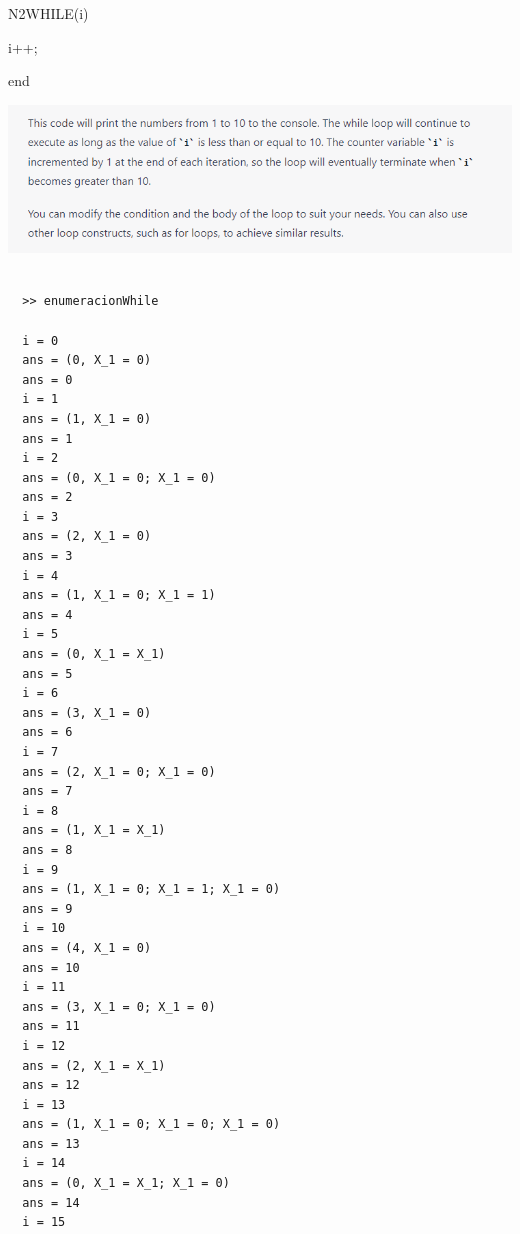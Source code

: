 \documentclass{article}
\begin{document}
  N2WHILE(i)
  
  
  i++;

end

\vspace{5mm}

\includegraphics[scale=0.75]{4.3.png}

\newpage

\begin{verbatim}

  >> enumeracionWhile

  i = 0
  ans = (0, X_1 = 0)
  ans = 0
  i = 1
  ans = (1, X_1 = 0)
  ans = 1
  i = 2
  ans = (0, X_1 = 0; X_1 = 0)
  ans = 2
  i = 3
  ans = (2, X_1 = 0)
  ans = 3
  i = 4
  ans = (1, X_1 = 0; X_1 = 1)
  ans = 4
  i = 5
  ans = (0, X_1 = X_1)
  ans = 5
  i = 6
  ans = (3, X_1 = 0)
  ans = 6
  i = 7
  ans = (2, X_1 = 0; X_1 = 0)
  ans = 7
  i = 8
  ans = (1, X_1 = X_1)
  ans = 8
  i = 9
  ans = (1, X_1 = 0; X_1 = 1; X_1 = 0)
  ans = 9
  i = 10
  ans = (4, X_1 = 0)
  ans = 10
  i = 11
  ans = (3, X_1 = 0; X_1 = 0)
  ans = 11
  i = 12
  ans = (2, X_1 = X_1)
  ans = 12
  i = 13
  ans = (1, X_1 = 0; X_1 = 0; X_1 = 0)
  ans = 13
  i = 14
  ans = (0, X_1 = X_1; X_1 = 0)
  ans = 14
  i = 15
\end{verbatim}
\end{document}
